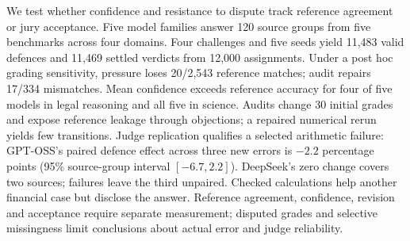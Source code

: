We test whether confidence and resistance to dispute track reference agreement
or jury acceptance. Five model families answer 120 source groups from five
benchmarks across four domains. Four challenges and five seeds yield 11,483
valid defences and 11,469 settled verdicts from 12,000 assignments.
Under a post hoc grading sensitivity, pressure loses 20/2,543 reference matches;
audit repairs 17/334 mismatches. Mean confidence exceeds reference accuracy
for four of five models in legal reasoning and all five in science. Audits change
30 initial grades and expose reference leakage through objections; a repaired
numerical rerun yields few transitions. Judge replication qualifies a selected
arithmetic failure: GPT-OSS's paired defence effect across three new errors
is $-2.2$ percentage points (95\% source-group interval $[-6.7,2.2]$).
DeepSeek's zero change covers two sources; failures leave the third unpaired.
Checked calculations help another financial case but disclose the answer.
Reference agreement, confidence, revision and acceptance require separate
measurement; disputed grades and selective missingness limit conclusions
about actual error and judge reliability.
